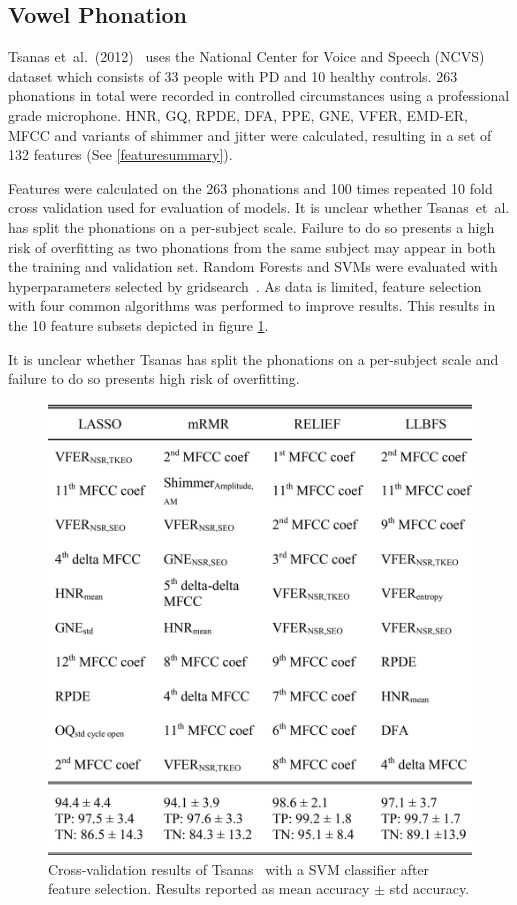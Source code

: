 \documentclass[12pt, twoside]{book}
\begin{document}
\subsection{Vowel Phonation}
\label{phonationpast}
Tsanas et~al.~(2012)~\cite{tsanas2012novel} uses the National Center for Voice and Speech (NCVS) dataset which consists of 33 people with PD and 10 healthy controls. 263 phonations in total were recorded in controlled circumstances using a professional grade microphone. HNR, GQ, RPDE, DFA, PPE, GNE, VFER, EMD-ER, MFCC and variants of shimmer and jitter were calculated, resulting in a set of 132 features (See \ref{featuresummary}).

Features were calculated on the 263 phonations and 100 times repeated 10 fold cross validation used for evaluation of models. It is unclear whether Tsanas~et~al. has split the phonations on a per-subject scale. Failure to do so presents a high risk of overfitting as two phonations from the same subject may appear in both the training and validation set. Random Forests and SVMs were evaluated with hyperparameters selected by gridsearch~\cite{gridsearch}. As data is limited, feature selection with four common algorithms was performed to improve results. This results in the 10 feature subsets depicted in figure \ref{tsanasresults}.

\begin{highlight}
It is unclear whether Tsanas has split the phonations on a per-subject scale and failure to do so presents high risk of overfitting.
\end{highlight}

\begin{figure}[h]
\caption{Cross-validation results of Tsanas~\cite{tsanas2012novel} with a SVM classifier after feature selection. Results reported as mean accuracy $\pm$ std accuracy.}
\label{tsanasresults}
\centering\includegraphics[width=0.75\linewidth]{tsanas.png}
\end{figure}
 
\end{document}
